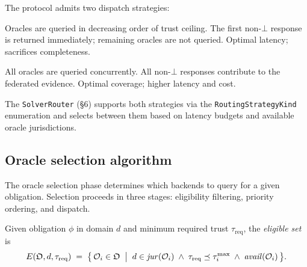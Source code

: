 \documentclass[11pt]{article}
\newcommand{\Oracle}{\mathcal{O}}            %
\newcommand{\OrcSet}{\mathfrak{O}}           %
\newcommand{\Orcl}[1]{\Oracle_{#1}}         %
\begin{document}
The protocol admits two dispatch strategies:

\begin{description}[nosep]
  \item[Sequential (priority-ordered).] Oracles are queried in
        decreasing order of trust ceiling.  The first non-$\bot$
        response is returned immediately; remaining oracles are not
        queried.  Optimal latency; sacrifices completeness.
  \item[Parallel (broadcast).] All oracles are queried concurrently.
        All non-$\bot$ responses contribute to the federated evidence.
        Optimal coverage; higher latency and cost.
\end{description}

The \texttt{SolverRouter} (§6) supports both strategies via the
\texttt{RoutingStrategyKind} enumeration and selects between them based
on latency budgets and available oracle jurisdictions.

\subsection{Oracle selection algorithm}\label{sec:selection-alg}

The oracle selection phase determines which backends to query for a given
obligation.  Selection proceeds in three stages: eligibility filtering,
priority ordering, and dispatch.

\begin{definition}\label{def:eligible}
  Given obligation $\phi$ in domain $d$ and minimum required trust
  $\tau_{\mathrm{req}}$, the \emph{eligible set} is
  \[
    E(\OrcSet, d, \tau_{\mathrm{req}}) \;=\;
    \bigl\{\, \Orcl{i} \in \OrcSet \;\bigm|\;
       d \in \mathit{jur}(\Orcl{i}) \;\wedge\;
       \tau_{\mathrm{req}} \tleq \tau_i^{\max} \;\wedge\;
       \mathit{avail}(\Orcl{i}) \,\bigr\}.
  \]
\end{definition}
\end{document}
